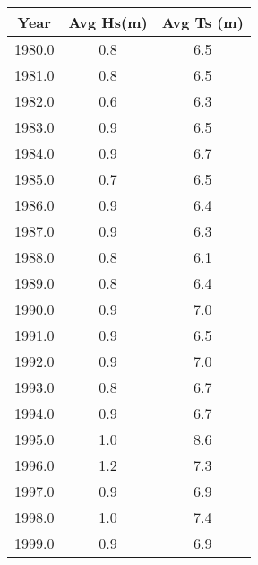\begin{tabular}{ccc}
Year & Avg Hs(m) & Avg Ts (m)\\ \hline
1980.0 & 0.8 & 6.5 \\
1981.0 & 0.8 & 6.5 \\
1982.0 & 0.6 & 6.3 \\
1983.0 & 0.9 & 6.5 \\
1984.0 & 0.9 & 6.7 \\
1985.0 & 0.7 & 6.5 \\
1986.0 & 0.9 & 6.4 \\
1987.0 & 0.9 & 6.3 \\
1988.0 & 0.8 & 6.1 \\
1989.0 & 0.8 & 6.4 \\
1990.0 & 0.9 & 7.0 \\
1991.0 & 0.9 & 6.5 \\
1992.0 & 0.9 & 7.0 \\
1993.0 & 0.8 & 6.7 \\
1994.0 & 0.9 & 6.7 \\
1995.0 & 1.0 & 8.6 \\
1996.0 & 1.2 & 7.3 \\
1997.0 & 0.9 & 6.9 \\
1998.0 & 1.0 & 7.4 \\
1999.0 & 0.9 & 6.9 \\
\hline
\end{tabular}
